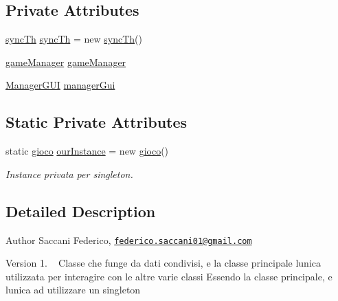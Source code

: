 \subsection*{Private Attributes}
\begin{DoxyCompactItemize}
\item 
\mbox{\hyperlink{class_snake_1_1game_1_1utility_1_1sync_th}{sync\+Th}} \mbox{\hyperlink{class_snake_1_1game_1_1gioco_ad1fc0de73f9b73491818970993ce6ea7}{sync\+Th}} = new \mbox{\hyperlink{class_snake_1_1game_1_1utility_1_1sync_th}{sync\+Th}}()
\item 
\mbox{\hyperlink{class_snake_1_1game_1_1utility_1_1game_manager}{game\+Manager}} \mbox{\hyperlink{class_snake_1_1game_1_1gioco_a719dbe54fbba578b11711a4b21e5b07c}{game\+Manager}}
\item 
\mbox{\hyperlink{class_snake_1_1gui_1_1_manager_g_u_i}{Manager\+G\+UI}} \mbox{\hyperlink{class_snake_1_1game_1_1gioco_a2d4e303de68f727259c79a2d5f09f85d}{manager\+Gui}}
\end{DoxyCompactItemize}
\subsection*{Static Private Attributes}
\begin{DoxyCompactItemize}
\item 
static \mbox{\hyperlink{class_snake_1_1game_1_1gioco}{gioco}} \mbox{\hyperlink{class_snake_1_1game_1_1gioco_a1bd69ae0618ecbc11419d8d59446cf91}{our\+Instance}} = new \mbox{\hyperlink{class_snake_1_1game_1_1gioco}{gioco}}()
\begin{DoxyCompactList}\small\item\em Instance privata per singleton. \end{DoxyCompactList}\end{DoxyCompactItemize}


\subsection{Detailed Description}
\begin{DoxyAuthor}{Author}
Saccani Federico, \href{mailto:federico.saccani01@gmail.com}{\tt federico.\+saccani01@gmail.\+com} 
\end{DoxyAuthor}
\begin{DoxyVersion}{Version}
1. ~\newline
Classe che funge da dati condivisi, e\textquotesingle{} la classe principale l\textquotesingle{}unica utilizzata per interagire con le altre varie classi Essendo la classe principale, e\textquotesingle{} l\textquotesingle{}unica ad utilizzare un singleton 
\end{DoxyVersion}


